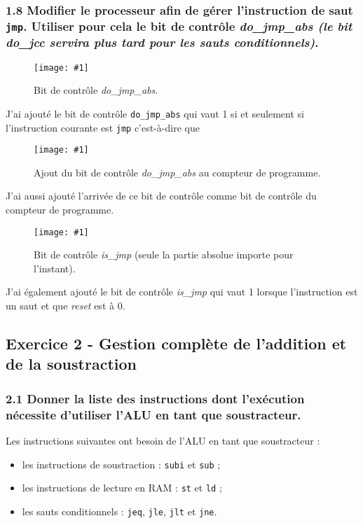 \documentclass[twoside, 12pt, a4paper]{article}
\newcommand{\cf}[3]{
    \begin{figure}[!h]
        \centering
        \texttt{[image: \#1]}
    \caption{#3}\label{Fig:#1}
    \end{figure}
}
\newcommand{\hcf}[2]{\cf{#1}{.75}{#2}}
\begin{document}
\clearpage
        
        \subsubsection*{\textbf{1.8} Modifier le processeur afin de gérer l'instruction de saut \texttt{jmp}. Utiliser pour cela le bit de contrôle \textit{do\_jmp\_abs (le bit \textit{do\_jcc} servira plus tard pour les sauts conditionnels)}.}

        \hcf{do_jmp_abs.png}{Bit de contrôle \textit{do\_jmp\_abs}.}
        
        J'ai ajouté le bit de contrôle \texttt{do\_jmp\_abs} qui vaut 1 si et seulement si l'instruction courante est \texttt{jmp} c'est-à-dire que 

        \hcf{clock_abs.png}{Ajout du bit de contrôle \textit{do\_jmp\_abs} au compteur de programme.}

        J'ai aussi ajouté l'arrivée de ce bit de contrôle comme bit de contrôle du compteur de programme.

        \hcf{is_jmp.png}{Bit de contrôle \textit{is\_jmp} (seule la partie absolue importe pour l'instant).}
        
        J'ai également ajouté le bit de contrôle \textit{is\_jmp} qui vaut 1 lorsque l'instruction est un saut et que \textit{reset} est à 0.


\newpage

        \subsection{Exercice 2 - Gestion complète de l'addition et de la soustraction}

        \subsubsection*{\textbf{2.1} Donner la liste des instructions dont l'exécution nécessite d'utiliser l'ALU en tant que soustracteur.}

    Les instructions suivantes ont besoin de l'ALU en tant que soustracteur :
    \begin{itemize}[nosep]
        \item les instructions de soustraction : \texttt{subi} et \texttt{sub} ;
        \item les instructions de lecture en RAM : \texttt{st} et \texttt{ld} ;
        \item les sauts conditionnels : \texttt{jeq}, \texttt{jle}, \texttt{jlt} et \texttt{jne}.
    \end{itemize}\vspace*{-\baselineskip}
\end{document}
